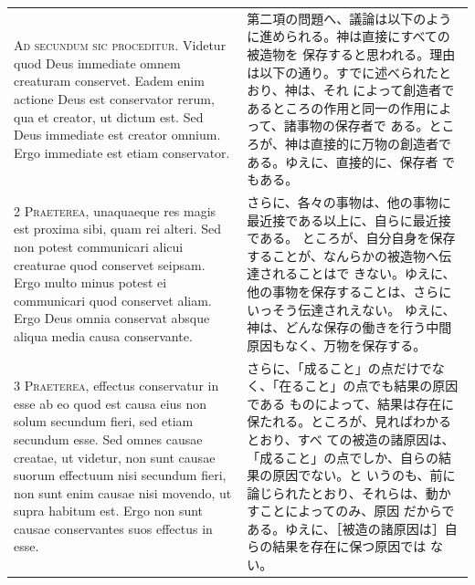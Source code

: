 \documentclass[paper=a4paper,fontsize=10pt,jafontsize=9pt,titlepage]{jlreq}
\begin{document}
\begin{longtable}{p{21em}p{21em}}



{\huge A}{\scshape d secundum sic proceditur}. Videtur quod
Deus immediate omnem creaturam conservet. Eadem enim actione Deus est
conservator rerum, qua et creator, ut dictum est. Sed Deus immediate est
creator omnium. Ergo immediate est etiam conservator.

&

第二項の問題へ、議論は以下のように進められる。神は直接にすべての被造物を
保存すると思われる。理由は以下の通り。すでに述べられたとおり、神は、それ
によって創造者であるところの作用と同一の作用によって、諸事物の保存者で
ある。ところが、神は直接的に万物の創造者である。ゆえに、直接的に、保存者
 でもある。

\\


{\scshape 2 Praeterea}, unaquaeque res magis est
proxima sibi, quam rei alteri. Sed non potest communicari alicui
creaturae quod conservet seipsam. Ergo multo minus potest ei communicari
quod conservet aliam. Ergo Deus omnia conservat absque aliqua media
causa conservante.

&

さらに、各々の事物は、他の事物に最近接である以上に、自らに最近接である。
 ところが、自分自身を保存することが、なんらかの被造物へ伝達されることはで
 きない。ゆえに、他の事物を保存することは、さらにいっそう伝達されえない。
 ゆえに、神は、どんな保存の働きを行う中間原因もなく、万物を保存する。


\\


{\scshape 3 Praeterea}, effectus conservatur in esse ab
eo quod est causa eius non solum secundum fieri, sed etiam secundum
esse. Sed omnes causae creatae, ut videtur, non sunt causae suorum
effectuum nisi secundum fieri, non sunt enim causae nisi movendo, ut
supra habitum est. Ergo non sunt causae conservantes suos effectus in
esse.

&

さらに、「成ること」の点だけでなく、「在ること」の点でも結果の原因である
 ものによって、結果は存在に保たれる。ところが、見ればわかるとおり、すべ
 ての被造の諸原因は、「成ること」の点でしか、自らの結果の原因でない。と
 いうのも、前に論じられたとおり、それらは、動かすことによってのみ、原因
 だからである。ゆえに、［被造の諸原因は］自らの結果を存在に保つ原因では
 ない。

\\



\end{longtable}
\end{document}
